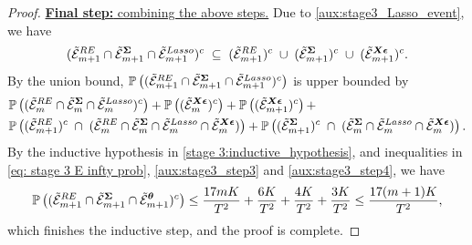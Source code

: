 \documentclass[10pt,a4paper]{amsart}
\newcommand{\Pro}{\mathbb{P}}
\newcommand{\bSigma}{\boldsymbol{\Sigma}}
\newcommand{\bX}{\boldsymbol{X}}
\newcommand{\bd}[1]{\boldsymbol{#1}}
\newcommand{\bepsilon}{\bd{\epsilon}}
\newcommand{\btheta}{\boldsymbol{\theta}}
\newcommand{\mE}{\mathcal{E}}
\begin{document}
\begin{proof}
\medskip
\noindent
\underline{\textbf{Final step:} combining the above steps.}
Due to \eqref{aux:stage3_Lasso_event}, we have
\begin{align*}
(\tilde{\mE}_{m+1}^{\textup{RE}}\cap\tilde{\mE}_{m+1}^{\bSigma}\cap \tilde{\mE}_{m+1}^{\textup{Lasso}})^c\;    \subseteq  \;(\tilde{\mE}_{m+1}^{\textup{RE}})^c\; \cup \; (\tilde{\mE}_{m+1}^{\bSigma})^c\; \cup\; (\tilde{\mE}_{m+1}^{\bX\bepsilon})^c.
\end{align*}
By the union bound, $\Pro\left((\tilde{\mE}_{m+1}^{\textup{RE}}\cap\tilde{\mE}_{m+1}^{\bSigma}\cap \tilde{\mE}_{m+1}^{\textup{Lasso}})^c\right)$ is upper bounded by
\begin{align*}
&    \Pro\left((\tilde{\mE}_{m}^{\textup{RE}}\cap\tilde{\mE}_{m}^{\bSigma}\cap \tilde{\mE}_{m}^{\textup{Lasso}})^c\right) + \Pro\left((\tilde{\mE}_{m}^{\bX\bepsilon})^c\right)+
    \Pro\left((\tilde{\mE}_{m+1}^{\bX\bepsilon})^c\right)+ \\
    & \Pro\left((\tilde{\mE}_{m+1}^{\textup{RE}})^c\; \cap \; (\tilde{\mE}_{m}^{\textup{RE}}\cap\tilde{\mE}_{m}^{\bSigma}\cap \tilde{\mE}_{m}^{\textup{Lasso}} \cap \tilde{\mE}_{m}^{\bX\bepsilon}) \right)
    +  \Pro\left((\tilde{\mE}_{m+1}^{\bSigma})^c\; \cap \; (\tilde{\mE}_{m}^{\bSigma}\cap \tilde{\mE}_{m}^{\textup{Lasso}}\cap \tilde{\mE}_{m}^{\bX\bepsilon}) \right).
\end{align*}
By the inductive hypothesis in \eqref{stage 3:inductive_hypothesis}, and inequalities in \eqref{eq: stage 3 E infty prob}, \eqref{aux:stage3_step3} and \eqref{aux:stage3_step4}, we have
\begin{align*}
\Pro\left((\tilde{\mE}_{m+1}^{\textup{RE}}\cap\tilde{\mE}_{m+1}^{\bSigma}\cap \tilde{\mE}_{m+1}^{\btheta})^c\right)
    \leq \frac{17mK}{T^2} +     \frac{6K}{T^2} + \frac{4K}{T^2} + \frac{3K}{T^2} \leq \frac{17(m+1)K}{T^2},
\end{align*}
which finishes the inductive step, and the proof is complete.
\end{proof}
\end{document}
